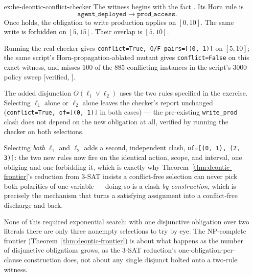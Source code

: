 \documentclass[11pt,a4paper]{article}
\theoremstyle{definition}
\theoremstyle{definition}
\theoremstyle{remark}
\begin{document}
\begin{pdsolution}{ex:he-deontic-conflict-checker}
The witness begins with the fact . Its Horn rule is
\[
\texttt{agent\_deployed}\to\texttt{prod\_access}.
\]
Once  holds, the obligation to write production applies on
$[0,10]$. The same write is forbidden on $[5,15]$. Their overlap is $[5,10]$.

Running the real checker gives \texttt{conflict=True, O/F pairs=[(0, 1)]} on
$[5,10]$; the same script's Horn-propagation-ablated mutant gives
\texttt{conflict=False} on this exact witness, and misses $100$ of the $885$
conflicting instances in the script's $3000$-policy sweep [verified,
].

The added disjunction $O(\ell_1\vee\ell_2)$ uses the two rules specified in
the exercise. Selecting $\ell_1$ alone or $\ell_2$ alone leaves the checker's report unchanged
(\texttt{conflict=True, of=[(0, 1)]} in both cases) --- the pre-existing
\texttt{write\_prod} clash does not depend on the new obligation at all, verified
by running the checker on both selections.

Selecting \emph{both} $\ell_1$ and
$\ell_2$ adds a second, independent clash, \texttt{of=[(0, 1), (2, 3)]}: the two
new rules now fire on the identical action, scope, and interval, one obliging
and one forbidding it, which is exactly why Theorem~\ref{thm:deontic-frontier}'s reduction from 3-SAT
insists a conflict-free selection can never pick both polarities of one
variable --- doing so is a clash \emph{by construction}, which is precisely the
mechanism that turns a satisfying assignment into a conflict-free discharge and
back.

None of this required exponential search: with one disjunctive obligation
over two literals there are only three nonempty selections to try by eye. The
NP-complete frontier (Theorem~\ref{thm:deontic-frontier}) is about what happens as the number of
disjunctive obligations grows, as the $3$-SAT reduction's one-obligation-per-clause
construction does, not about any single disjunct bolted onto a two-rule
witness.
\end{pdsolution}

\end{document}
